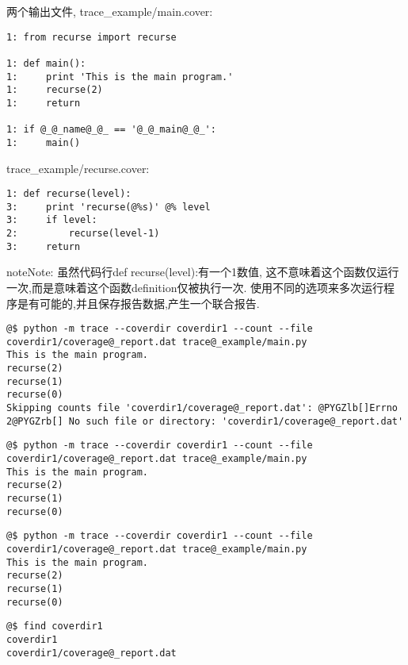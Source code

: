 \documentclass[letterpaper,10pt,english]{manual}
\begin{document}
两个输出文件, trace\_example/main.cover:

\begin{Verbatim}[commandchars=@\[\]]
1: from recurse import recurse

1: def main():
1:     print 'This is the main program.'
1:     recurse(2)
1:     return

1: if @_@_name@_@_ == '@_@_main@_@_':
1:     main()
\end{Verbatim}

trace\_example/recurse.cover:

\begin{Verbatim}[commandchars=@\[\]]
1: def recurse(level):
3:     print 'recurse(@%s)' @% level
3:     if level:
2:         recurse(level-1)
3:     return
\end{Verbatim}

\begin{notice}{note}{Note:}
虽然代码行def recurse(level):有一个1数值, 这不意味着这个函数仅运行一次,而是意味着这个函数definition仅被执行一次.
使用不同的选项来多次运行程序是有可能的,并且保存报告数据,产生一个联合报告.
\end{notice}

\begin{Verbatim}[commandchars=@\[\]]
@$ python -m trace --coverdir coverdir1 --count --file coverdir1/coverage@_report.dat trace@_example/main.py
This is the main program.
recurse(2)
recurse(1)
recurse(0)
Skipping counts file 'coverdir1/coverage@_report.dat': @PYGZlb[]Errno 2@PYGZrb[] No such file or directory: 'coverdir1/coverage@_report.dat'
\end{Verbatim}

\begin{Verbatim}[commandchars=@\[\]]
@$ python -m trace --coverdir coverdir1 --count --file coverdir1/coverage@_report.dat trace@_example/main.py
This is the main program.
recurse(2)
recurse(1)
recurse(0)
\end{Verbatim}

\begin{Verbatim}[commandchars=@\[\]]
@$ python -m trace --coverdir coverdir1 --count --file coverdir1/coverage@_report.dat trace@_example/main.py
This is the main program.
recurse(2)
recurse(1)
recurse(0)
\end{Verbatim}

\begin{Verbatim}[commandchars=@\[\]]
@$ find coverdir1
coverdir1
coverdir1/coverage@_report.dat
\end{Verbatim}
\end{document}
